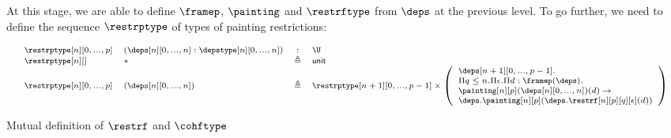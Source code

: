 \documentclass{msc}
\newcommand{\unittype}{\ensuremath{\mathsf{unit}}}
\newcommand{\unitpoint}{\ensuremath{\ast}}
\newcommand{\defeq}{\ensuremath{\triangleq}}
\begin{document}
At this stage, we are able to define $\framep$, $\painting$ and $\restrftype$ from $\deps$ at the previous level. To go further, we need to define the sequence $\restrptype$ of types of painting restrictions:

\begin{equation*}
  \fontsize{7.2}{9}\selectfont
  \begin{array}{llcl}
    \restrptype[n][0,...,p] & (\deps[n][0,...,n]:\depstype[n][0,...,n]) & :      & \U                                        \\
    \restrptype[n][]        & \unitpoint                                & \defeq & \unittype                                 \\
    \restrptype[n][0,...,p] & (\deps[n][0,...,n])                       & \defeq & \restrptype[n+1][0,...,p-1] \times \left(
    \begin{array}{l}
        \deps[n+1][0,...,p-1].                            \\ \Pi q\leq n.\Pi \epsilon.\Pi d:\framep(\deps).\\
        \painting[n][p](\deps[n][0,...,n])(d) \rightarrow \\ \deps.\painting[n][p](\deps.\restrf[n][p][q][\epsilon](d))\end{array}
    \right)                                                                                                                  \\
  \end{array}
\end{equation*}


Mutual definition of $\restrf$ and $\cohftype$
\end{document}
